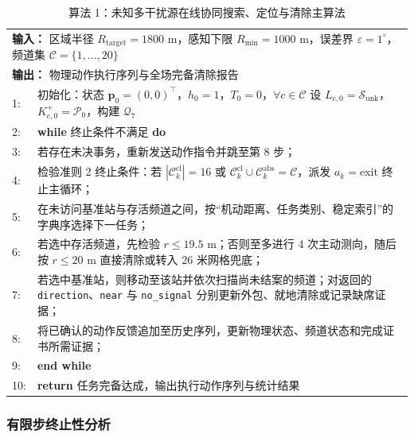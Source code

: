 \documentclass[zihao=-4,a4paper,UTF8]{ctexart}
\begin{document}
\begin{table}[htbp]
    \centering
    \small
    \caption{算法 1：未知多干扰源在线协同搜索、定位与清除主算法}
    \label{alg:q3_unified_loop}
    \renewcommand{\arraystretch}{1.05}
    \begin{tabularx}{\linewidth}{l X}
        \toprule[1.5pt]
        \multicolumn{2}{X}{\textbf{输入：} 区域半径 $R_{\mathrm{target}}=1800\text{ m}$，感知下限 $R_{\min}=1000\text{ m}$，误差界 $\varepsilon=1^\circ$，频道集 $\mathcal{C}=\{1,\dots,20\}$} \\
        \multicolumn{2}{X}{\textbf{输出：} 物理动作执行序列与全场完备清除报告} \\
        \midrule
        1: & 初始化：状态 $\mathbf{p}_0=(0,0)^\top$，$h_0=1$，$T_0=0$，$\forall c \in \mathcal{C}$ 设 $L_{c,0}=\mathcal{S}_{\mathrm{unk}}$，$K_{c,0}^+=\mathcal{P}_0$，构建 $\mathcal{Q}_7$ \\
        2: & \textbf{while} 终止条件不满足 \textbf{do} \\
        3: & \quad 若存在未决事务，重新发送动作指令并跳至第 8 步； \\
        4: & \quad 检验准则 2 终止条件：若 $|\mathcal{C}_k^{\mathrm{cl}}|=16$ 或 $\mathcal{C}_k^{\mathrm{cl}} \cup \mathcal{C}_k^{\mathrm{abs}}=\mathcal{C}$，派发 $a_k = \mathrm{exit}$ 终止主循环； \\
        5: & \quad 在未访问基准站与存活频道之间，按“机动距离、任务类别、稳定索引”的字典序选择下一任务； \\
        6: & \quad 若选中存活频道，先检验 $r\le19.5\text{ m}$；否则至多进行 4 次主动测向，随后按 $r\le20\text{ m}$ 直接清除或转入 26 米网格兜底； \\
        7: & \quad 若选中基准站，则移动至该站并依次扫描尚未结案的频道；对返回的 \texttt{direction}、\texttt{near} 与 \texttt{no\_signal} 分别更新外包、就地清除或记录缺席证据； \\
        8: & \quad 将已确认的动作反馈追加至历史序列，更新物理状态、频道状态和完成证书所需证据； \\
        9: & \textbf{end while} \\
        10: & \textbf{return} 任务完备达成，输出执行动作序列与统计结果 \\
        \bottomrule[1.5pt]
    \end{tabularx}
\end{table}

\subsubsection{有限步终止性分析}
\end{document}
